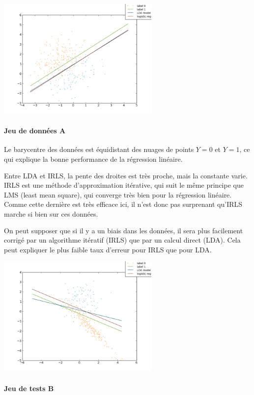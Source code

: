 \documentclass{article}
\begin{document}
\includegraphics[width=300px]{classificationA1.png}


\paragraph{Jeu de données A}

Le barycentre des données est équidistant des nuages de points $Y = 0$ et $Y =
1$, ce qui explique la bonne performance de la régression linéaire.

Entre LDA et IRLS, la pente des droites est très proche, mais la constante
varie. IRLS est une méthode d'approximation itérative, qui suit le même
principe que LMS (least mean square), qui converge très bien pour la
régression linéaire. Comme cette dernière est très efficace ici, il n'est donc
pas surprenant qu'IRLS marche si bien sur ces données.

On peut supposer que si il y a un biais dans les données, il sera plus
facilement corrigé par un algorithme itératif (IRLS) que par un calcul direct
(LDA). Cela peut expliquer le plus faible taux d'erreur pour IRLS que pour
LDA.


\includegraphics[width=300px]{classificationB1.png}


\paragraph{Jeu de tests B}
\end{document}
